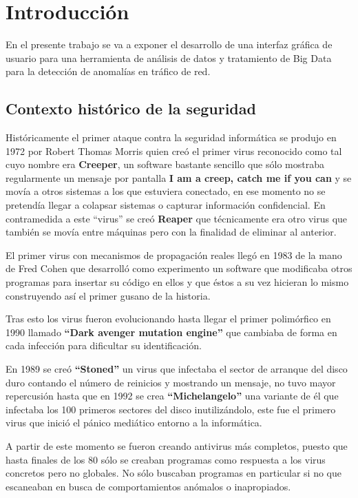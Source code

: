 \chapter{Introducción}

En el presente trabajo se va a exponer el desarrollo de una interfaz gráfica de usuario para una herramienta de análisis de datos y tratamiento de Big Data para la detección de anomalías en tráfico de red.
\bigskip

\section{Contexto histórico de la seguridad}  

\cite{CHS} \cite{ISS} Históricamente el primer ataque contra la seguridad informática se produjo en 1972 por Robert Thomas Morris quien creó el primer virus reconocido como tal cuyo nombre era \textbf{Creeper}, un software bastante sencillo que sólo mostraba regularmente un mensaje por pantalla \textbf{I am a creep, catch me if you can} y se movía a otros sistemas a los que estuviera conectado, en ese momento no se pretendía llegar a colapsar sistemas o capturar información confidencial. En contramedida a este “virus” se creó \textbf{Reaper} que técnicamente era otro virus que también se movía entre máquinas pero con la finalidad de eliminar al anterior.
\bigskip

\cite{PVI}El primer virus con mecanismos de propagación reales llegó en 1983 de la mano de Fred Cohen que desarrolló como experimento un software que modificaba otros programas para insertar su código en ellos y que éstos a su vez hicieran lo mismo construyendo así el primer gusano de la historia.
\bigskip

Tras esto los virus fueron evolucionando hasta llegar el primer polimórfico  en 1990 llamado \textbf{“Dark avenger mutation engine”} que cambiaba de forma en cada infección para dificultar su identificación.
\bigskip

En 1989 se creó \textbf{“Stoned”} un virus que infectaba el sector de arranque del disco duro contando el número de reinicios y mostrando un mensaje, no tuvo mayor repercusión hasta que en 1992 se crea \textbf{“Michelangelo”} una variante de él que infectaba los 100 primeros sectores del disco inutilizándolo, este fue el primero virus que inició el pánico mediático entorno a la informática.
\bigskip

A partir de este momento se fueron creando antivirus más completos, puesto que hasta finales de los 80 sólo se creaban programas como respuesta a los virus concretos pero no globales. No sólo buscaban programas en particular si no que escaneaban en busca de comportamientos anómalos o inapropiados.
\bigskip

